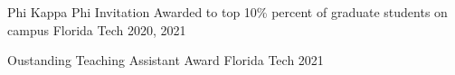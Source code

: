 \begin{cvhonors}
	\cvhonor
	{Phi Kappa Phi Invitation}
	{Awarded to top 10\% percent of graduate students on campus}
	{Florida Tech}
	{2020, 2021}

	\cvhonor
	{Oustanding Teaching Assistant Award}
	{}
	{Florida Tech}
	{2021}

\end{cvhonors}
